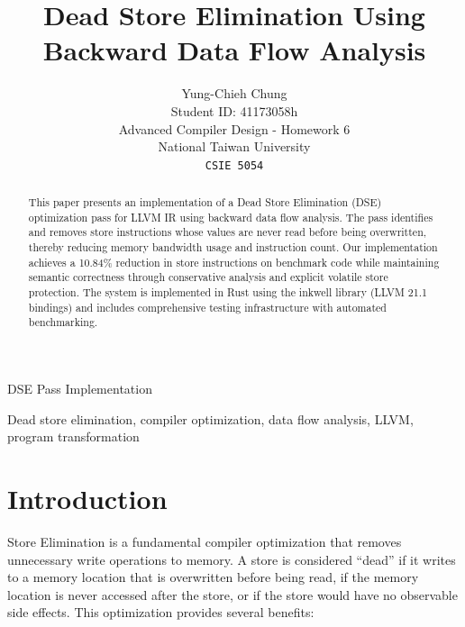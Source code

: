 \documentclass[journal]{IEEEtran}
\begin{document}
\title{Dead Store Elimination Using Backward Data Flow Analysis}

\author{Yung-Chieh Chung\\
Student ID: 41173058h\\
Advanced Compiler Design - Homework 6\\
National Taiwan University\\
\texttt{CSIE 5054}}

%
{DSE Pass Implementation}

\maketitle

\begin{abstract}
This paper presents an implementation of a Dead Store Elimination (DSE) optimization pass for LLVM IR using backward data flow analysis. The pass identifies and removes store instructions whose values are never read before being overwritten, thereby reducing memory bandwidth usage and instruction count. Our implementation achieves a 10.84\% reduction in store instructions on benchmark code while maintaining semantic correctness through conservative analysis and explicit volatile store protection. The system is implemented in Rust using the inkwell library (LLVM 21.1 bindings) and includes comprehensive testing infrastructure with automated benchmarking.
\end{abstract}

\begin{IEEEkeywords}
Dead store elimination, compiler optimization, data flow analysis, LLVM, program transformation
\end{IEEEkeywords}

\IEEEpeerreviewmaketitle

\section{Introduction}

 Store Elimination is a fundamental compiler optimization that removes unnecessary write operations to memory. A store is considered ``dead'' if it writes to a memory location that is overwritten before being read, if the memory location is never accessed after the store, or if the store would have no observable side effects. This optimization provides several benefits:
\end{document}
